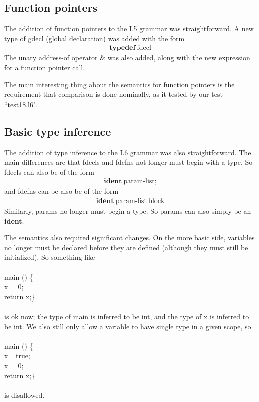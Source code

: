 \documentclass{article}
\begin{document}
\subsection{Function pointers}
The addition of function pointers to the L5 grammar was straightforward. A new type of gdecl (global declaration) was added with the form \begin{align*}
\textbf{typedef} \ \textrm{fdecl}
\end{align*}
The unary address-of operator $\&$ was also added, along with the new expression for a function pointer call.

The main interesting thing about the semantics for function pointers is the requirement that comparison is done nominally, as it tested by our test ``test18.l6".

\subsection{Basic type inference}
The addition of type inference to the L6 grammar was also straightforward. The main differences are that fdecls and fdefns not longer must begin with a type. So fdecls can also be of the form
\begin{align*}
\textbf{ident} \ \textrm{param-list};
\end{align*}
and fdefns can be also be of the form
\begin{align*}
\textbf{ident} \ \textrm{param-list} \ \textrm{block}
\end{align*}
Similarly, params no longer must begin a type. So params can also simply be an \textbf{ident}.

The semantics also required significant changes. On the more basic side, variables no longer must be declared before they are defined (although they must still be initialized). So something like\\
\\
main () \{\\
 x = 0;\\
 return x;\}\\
 \\
is ok now; the type of main is inferred to be int, and the type of x is inferred to be int. We also still only allow a variable to have single type in a given scope, so\\
\\
main () \{\\
 x= true;\\
 x = 0;\\
 return x;\}\\
 \\
is disallowed. 
\end{document}
